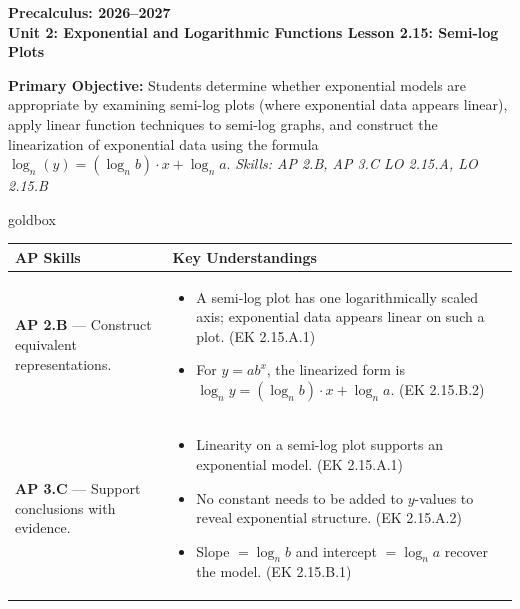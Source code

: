 \documentclass[10pt]{article}
\newcommand{\CourseName}{Precalculus}
\newcommand{\SchoolYear}{2026--2027}
\newcommand{\UnitNumberName}{Unit 2: Exponential and Logarithmic Functions \quad}
\newcommand{\LessonNumberName}{Lesson 2.15: Semi-log Plots}
\begin{document}
\begin{center}
    {\Large\bfseries \CourseName: \SchoolYear \\
    {\small\bfseries \UnitNumberName \LessonNumberName}}
\end{center}

\begin{tcolorbox}[colback=sky, colframe=navy, boxrule=0.9pt, arc=2mm,
    left=2mm, right=2mm, top=1.5mm, bottom=1.5mm]
    \textbf{Primary Objective:} Students determine whether exponential models are appropriate
    by examining semi-log plots (where exponential data appears linear), apply linear function
    techniques to semi-log graphs, and construct the linearization of exponential data using
    the formula $\log_n(y) = (\log_n b)\cdot x + \log_n a$.
    \hfill\textit{\small Skills: AP 2.B, AP 3.C \quad LO 2.15.A, LO 2.15.B}
\end{tcolorbox}

\renewcommand{\arraystretch}{1.6}
\begin{skillbox}{goldbox}
\begin{tabularx}{\linewidth}{@{}X X@{}}
\textbf{AP Skills} &
\textbf{Key Understandings} \\
\midrule
\textbf{AP 2.B} --- Construct equivalent representations. &
\begin{itemize}[leftmargin=1.2em,itemsep=2pt,topsep=0pt]
  \item A semi-log plot has one logarithmically scaled axis; exponential data appears linear
        on such a plot. (EK 2.15.A.1)
  \item For $y = ab^x$, the linearized form is
        $\log_n y = (\log_n b)\cdot x + \log_n a$. (EK 2.15.B.2)
\end{itemize} \\
\textbf{AP 3.C} --- Support conclusions with evidence. &
\begin{itemize}[leftmargin=1.2em,itemsep=2pt,topsep=0pt]
  \item Linearity on a semi-log plot supports an exponential model. (EK 2.15.A.1)
  \item No constant needs to be added to $y$-values to reveal exponential structure.
        (EK 2.15.A.2)
  \item Slope $= \log_n b$ and intercept $= \log_n a$ recover the model. (EK 2.15.B.1)
\end{itemize} \\
\end{tabularx}
\end{skillbox}
\end{document}
